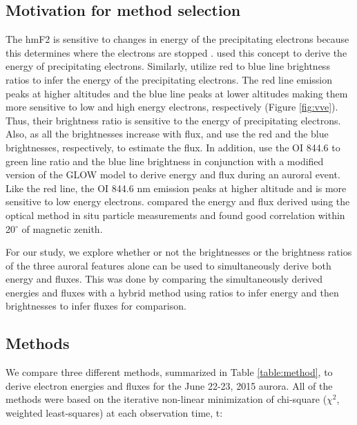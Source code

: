 \subsection{Motivation for method selection}
The hmF2 is sensitive to changes in energy of the precipitating electrons because this determines where the electrons are stopped \citep{rees_1963}. \cite{pallamraju_2011} used this concept to derive the energy of precipitating electrons. Similarly, \cite{rees_1974} utilize red to blue line brightness ratios to infer the energy of the precipitating electrons. The red line emission peaks at higher altitudes and the blue line peaks at lower altitudes making them more sensitive to low and high energy electrons, respectively (Figure \ref{fig:vve}). Thus, their brightness ratio is sensitive to the energy of precipitating electrons. Also, as all the brightnesses increase with flux, \cite{pallamraju_2011} and \cite{rees_1963} use the red and the blue brightnesses, respectively, to estimate the flux. In addition, \citet{grubbs_compare} use the OI 844.6 to green line ratio and the blue line brightness in conjunction with a modified version of the GLOW model to derive energy and flux during an auroral event. Like the red line, the OI 844.6 nm emission peaks at higher altitude and is more sensitive to low energy electrons. \citet{grubbs_compare} compared the energy and flux derived using the optical method in situ particle measurements and found good correlation within 20$^\circ$ of magnetic zenith.

For our study, we explore whether or not the brightnesses or the brightness ratios of the three auroral features alone can be used to simultaneously derive both energy and fluxes. This was done by comparing the simultaneously derived energies and fluxes with a hybrid method using ratios to infer energy and then brightnesses to infer fluxes for comparison. 

\subsection{Methods}
We compare three different methods, summarized in Table \ref{table:method}, to derive electron energies and fluxes for the June 22-23, 2015 aurora. 
All of the methods were based on the iterative non-linear minimization of chi-square ($\chi^2$, weighted least-squares) at each observation time, t:


